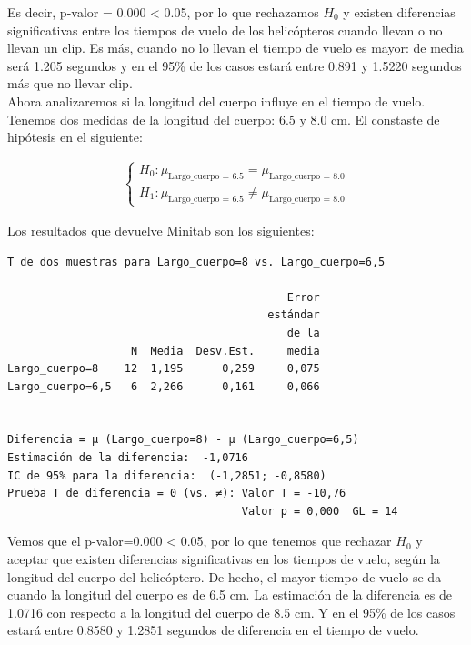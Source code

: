 \documentclass[12pt,a4paper,twoside,openright,titlepage,final]{article}
\begin{document}
Es decir, p-valor = 0.000 < 0.05, por lo que rechazamos $H_0$ y existen diferencias significativas entre los tiempos de vuelo de los helicópteros cuando llevan o no llevan un clip. Es más, cuando no lo llevan el tiempo de vuelo es mayor: de media será 1.205 segundos y en el 95\% de los casos estará entre 0.891 y 1.5220 segundos más que no llevar clip.\\

Ahora analizaremos si la longitud del cuerpo influye en el tiempo de vuelo. Tenemos dos medidas de la longitud del cuerpo: 6.5 y 8.0 cm. El constaste de hipótesis en el siguiente:

\begin{eqnarray*}
	\begin{cases}
		H_0: \mu_{\text{Largo\_cuerpo = 6.5}} = \mu_{\text{Largo\_cuerpo = 8.0}} \\
		H_1: \mu_{\text{Largo\_cuerpo = 6.5}} \neq \mu_{\text{Largo\_cuerpo = 8.0}}
	\end{cases}
\end{eqnarray*}

Los resultados que devuelve Minitab son los siguientes:

\begin{verbatim}
T de dos muestras para Largo_cuerpo=8 vs. Largo_cuerpo=6,5

                                           Error
                                        estándar
                                           de la
                   N  Media  Desv.Est.     media
Largo_cuerpo=8    12  1,195      0,259     0,075
Largo_cuerpo=6,5   6  2,266      0,161     0,066


Diferencia = μ (Largo_cuerpo=8) - μ (Largo_cuerpo=6,5)
Estimación de la diferencia:  -1,0716
IC de 95% para la diferencia:  (-1,2851; -0,8580)
Prueba T de diferencia = 0 (vs. ≠): Valor T = -10,76  
                                    Valor p = 0,000  GL = 14
\end{verbatim}

Vemos que el p-valor=0.000 < 0.05, por lo que tenemos que rechazar $H_0$ y aceptar que existen diferencias significativas en los tiempos de vuelo, según la longitud del cuerpo del helicóptero. De hecho, el mayor tiempo de vuelo se da cuando la longitud del cuerpo es de 6.5 cm. La estimación de la diferencia es de 1.0716 con respecto a la longitud del cuerpo de 8.5 cm. Y en el 95\% de los casos estará entre 0.8580 y 1.2851 segundos de diferencia en el tiempo de vuelo. \\
\end{document}
